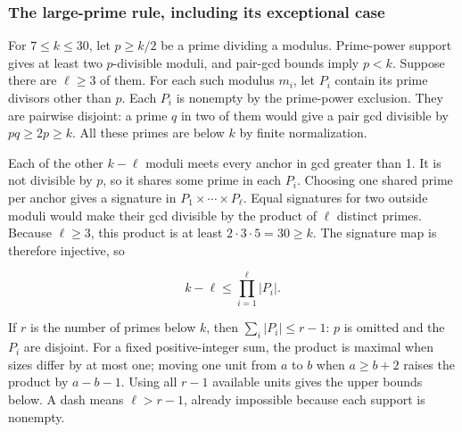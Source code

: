 \documentclass[11pt,a4paper]{article}
\begin{document}
\subsubsection{The large-prime rule, including its exceptional case}\label{the-large-prime-rule-including-its-exceptional-case}

For \(7\le k\le30\), let \(p\ge k/2\) be a prime dividing a modulus. Prime-power support gives at least two \(p\)-divisible moduli, and pair-gcd bounds imply \(p<k\). Suppose there are \(\ell\ge3\) of them. For each such modulus \(m_i\), let \(P_i\) contain its prime divisors other than \(p\). Each \(P_i\) is nonempty by the prime-power exclusion. They are pairwise disjoint: a prime \(q\) in two of them would give a pair gcd divisible by \(pq\ge2p\ge k\). All these primes are below \(k\) by finite normalization.

Each of the other \(k-\ell\) moduli meets every anchor in gcd greater than 1. It is not divisible by \(p\), so it shares some prime in each \(P_i\). Choosing one shared prime per anchor gives a signature in \(P_1\times\cdots\times P_\ell\). Equal signatures for two outside moduli would make their gcd divisible by the product of \(\ell\) distinct primes. Because \(\ell\ge3\), this product is at least \(2\cdot3\cdot5=30\ge k\). The signature map is therefore injective, so

\[
  k-\ell\le\prod_{i=1}^{\ell}|P_i|. \tag{1}
\]

If \(r\) is the number of primes below \(k\), then \(\sum_i|P_i|\le r-1\): \(p\) is omitted and the \(P_i\) are disjoint. For a fixed positive-integer sum, the product is maximal when sizes differ by at most one; moving one unit from \(a\) to \(b\) when \(a\ge b+2\) raises the product by \(a-b-1\). Using all \(r-1\) available units gives the upper bounds below. A dash means \(\ell>r-1\), already impossible because each support is nonempty.
\end{document}
